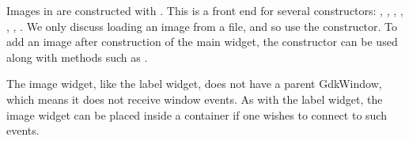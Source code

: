 Images in  are constructed with
. This is a front end for several constructors:
,
,
, ,
,
,
. We only discuss loading an
image from a file, and so use the 
constructor. To add an image after construction of the main widget,
the  constructor can be used along with
methods such as .

The image widget, like the label widget, does not have a parent
GdkWindow, which means it does not receive window events. As with the
label widget, the image widget can be placed inside a
 container if one wishes to connect to such
events.



